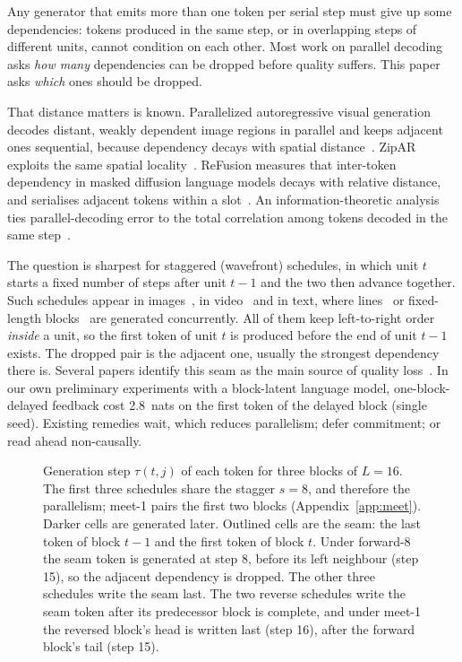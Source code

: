 \documentclass[11pt]{article}
\theoremstyle{definition}
\theoremstyle{remark}
\newcommand{\sch}[1]{\textsf{#1}}
\begin{document}
Any generator that emits more than one token per serial step must give up some dependencies: tokens produced in the same step, or in overlapping steps of different units, cannot condition on each other.
Most work on parallel decoding asks \emph{how many} dependencies can be dropped before quality suffers.
This paper asks \emph{which} ones should be dropped.

That distance matters is known.
Parallelized autoregressive visual generation decodes distant, weakly dependent image regions in parallel and keeps adjacent ones sequential, because dependency decays with spatial distance~\citep{wang2025par}.
ZipAR exploits the same spatial locality~\citep{he2025zipar}.
ReFusion measures that inter-token dependency in masked diffusion language models decays with relative distance, and serialises adjacent tokens within a slot~\citep{li2025refusion}.
An information-theoretic analysis ties parallel-decoding error to the total correlation among tokens decoded in the same step~\citep{zhang2026generation}.

The question is sharpest for staggered (wavefront) schedules, in which unit $t$ starts a fixed number of steps after unit $t-1$ and the two then advance together.
Such schedules appear in images~\citep{he2025zipar}, in video~\citep{ye2025diagonal} and in text, where lines~\citep{li2026lclm,zhang2026latlm} or fixed-length blocks~\citep{he2026psf} are generated concurrently.
All of them keep left-to-right order \emph{inside} a unit, so the first token of unit $t$ is produced before the end of unit $t-1$ exists.
The dropped pair is the adjacent one, usually the strongest dependency there is.
Several papers identify this seam as the main source of quality loss~\citep{he2025zipar,li2026lclm,zhang2026latlm,he2026psf}.
In our own preliminary experiments with a block-latent language model, one-block-delayed feedback cost 2.8~nats on the first token of the delayed block (single seed).
Existing remedies wait, which reduces parallelism; defer commitment; or read ahead non-causally.

\begin{figure}[t]
  \centering
  \resizebox{\textwidth}{!}{}
  \caption{Generation step $\tau(t,j)$ of each token for three blocks of $L=16$. The first three schedules share the stagger $s=8$, and therefore the parallelism; \sch{meet-1} pairs the first two blocks (Appendix~\ref{app:meet}). Darker cells are generated later. Outlined cells are the seam: the last token of block $t-1$ and the first token of block $t$.
  Under \sch{forward-8} the seam token is generated at step 8, before its left neighbour (step 15), so the adjacent dependency is dropped.
  The other three schedules write the seam last. The two reverse schedules write the seam token after its predecessor block is complete, and under \sch{meet-1} the reversed block's head is written last (step 16), after the forward block's tail (step 15).}
  \label{fig:schedule}
\end{figure}
\end{document}
